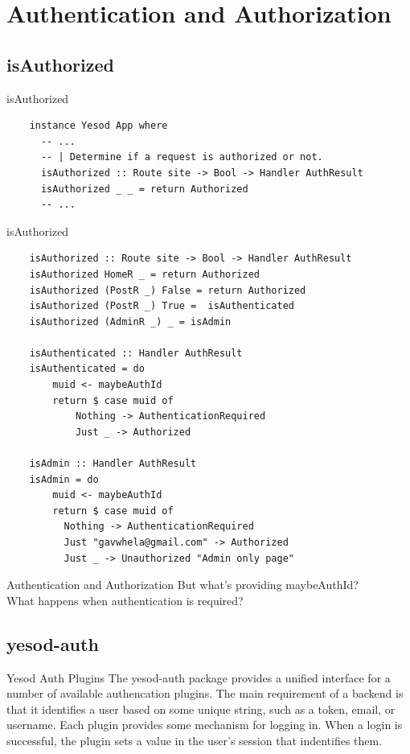 \documentclass[pdf]{beamer}
\begin{document}
\section{Authentication and Authorization}
\subsection{isAuthorized}
\begin{frame}[fragile]{isAuthorized}
  \begin{verbatim}
    instance Yesod App where
      -- ...
      -- | Determine if a request is authorized or not.
      isAuthorized :: Route site -> Bool -> Handler AuthResult
      isAuthorized _ _ = return Authorized
      -- ...
  \end{verbatim}
\end{frame}

\begin{frame}[fragile]{isAuthorized}
  \begin{verbatim}
    isAuthorized :: Route site -> Bool -> Handler AuthResult
    isAuthorized HomeR _ = return Authorized
    isAuthorized (PostR _) False = return Authorized
    isAuthorized (PostR _) True =  isAuthenticated
    isAuthorized (AdminR _) _ = isAdmin

    isAuthenticated :: Handler AuthResult
    isAuthenticated = do
        muid <- maybeAuthId
        return $ case muid of
            Nothing -> AuthenticationRequired
            Just _ -> Authorized

    isAdmin :: Handler AuthResult
    isAdmin = do
        muid <- maybeAuthId
        return $ case muid of
          Nothing -> AuthenticationRequired
          Just "gavwhela@gmail.com" -> Authorized
          Just _ -> Unauthorized "Admin only page"
  \end{verbatim}
\end{frame}

\begin{frame}{Authentication and Authorization}
  But what's providing maybeAuthId?\\
  What happens when authentication is required?\\
\end{frame}

\subsection{yesod-auth}
\begin{frame}{Yesod Auth Plugins}
  The yesod-auth package provides a unified interface for a number of
  available authencation plugins. The main requirement of a backend is
  that it identifies a user based on some unique string, such as a
  token, email, or username. Each plugin provides some mechanism for
  logging in. When a login is successful, the plugin sets a value in
  the user's session that indentifies them.
\end{frame}
\end{document}
